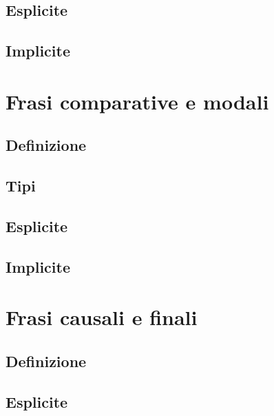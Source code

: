 \documentclass[
  a4paper,
  twoside,
  11pt,
  chapterprefix=false,
  bibliography=totocnumbered,
  listof=flat]{scrbook}
\begin{document}
\hypertarget{esplicite-1}{%
\section{Esplicite}\label{esplicite-1}}

\hypertarget{implicite-1}{%
\section{Implicite}\label{implicite-1}}

\hypertarget{frasi-comparative-e-modali}{%
\chapter{Frasi comparative e modali}\label{frasi-comparative-e-modali}}

\hypertarget{definizione-1}{%
\section{Definizione}\label{definizione-1}}

\hypertarget{tipi-2}{%
\section{Tipi}\label{tipi-2}}

\hypertarget{esplicite-2}{%
\section{Esplicite}\label{esplicite-2}}

\hypertarget{implicite-2}{%
\section{Implicite}\label{implicite-2}}

\hypertarget{frasi-causali-e-finali}{%
\chapter{Frasi causali e finali}\label{frasi-causali-e-finali}}

\hypertarget{definizione-2}{%
\section{Definizione}\label{definizione-2}}

\hypertarget{esplicite-3}{%
\section{Esplicite}\label{esplicite-3}}
\end{document}
